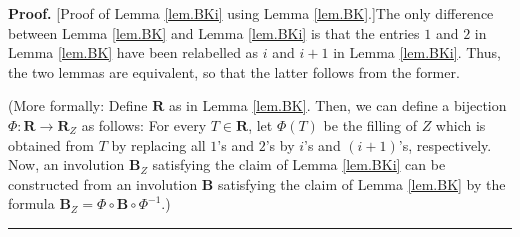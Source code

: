\documentclass[numbers=enddot,12pt,final,onecolumn,notitlepage]{scrartcl}%
\theoremstyle{definition}
\newenvironment{proof}[1][Proof]{\noindent\textbf{#1.} }{\ \rule{0.5em}{0.5em}}
\newenvironment{vershort}{}{}
\begin{document}
\begin{vershort}
\begin{proof}
[Proof of Lemma \ref{lem.BKi} using Lemma \ref{lem.BK}.]The only difference
between Lemma \ref{lem.BK} and Lemma \ref{lem.BKi} is that the entries $1$ and
$2$ in Lemma \ref{lem.BK} have been relabelled as $i$ and $i+1$ in Lemma
\ref{lem.BKi}. Thus, the two lemmas are equivalent, so that the latter follows
from the former.

(More formally: Define $\mathbf{R}$ as in Lemma \ref{lem.BK}. Then, we can
define a bijection $\Phi:\mathbf{R}\rightarrow\mathbf{R}_{Z}$ as follows: For
every $T\in\mathbf{R}$, let $\Phi\left(  T\right)  $ be the filling of $Z$
which is obtained from $T$ by replacing all $1$'s and $2$'s by $i$'s and
$\left(  i+1\right)  $'s, respectively. Now, an involution $\mathbf{B}_{Z}$
satisfying the claim of Lemma \ref{lem.BKi} can be constructed from an
involution $\mathbf{B}$ satisfying the claim of Lemma \ref{lem.BK} by the
formula $\mathbf{B}_{Z}=\Phi\circ\mathbf{B}\circ\Phi^{-1}$.)
\end{proof}
\end{vershort}
\end{document}
